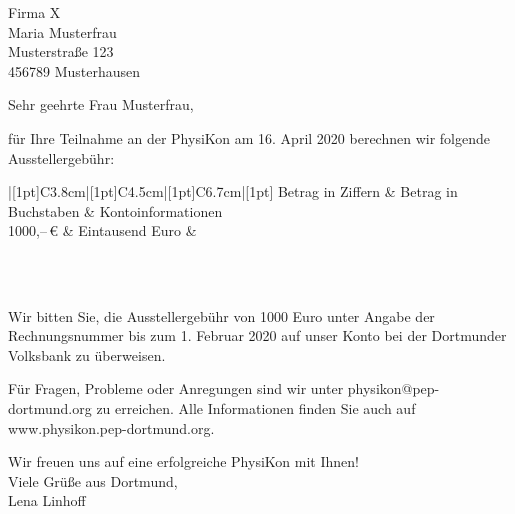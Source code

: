 \documentclass[
  pepbrief,
  fontsize=12pt,
  paper=a4,
  DIV=14,
  parskip=half,
  backaddress=false,
]{scrlttr2}
\author{Lena Linhoff}
\begin{document}
\begin{letter}{%
  Firma X\\
  Maria Musterfrau\\
  Musterstraße 123\\
  456789 Musterhausen
}
\opening{Sehr geehrte Frau Musterfrau,}
für Ihre Teilnahme an der PhysiKon am 16. April 2020 berechnen wir folgende Ausstellergebühr:

\renewcommand{\arraystretch}{1.2}
\begin{center}
  \bfseries\scshape
	\begin{tabu}{|[1pt]C{3.8cm}|[1pt]C{4.5cm}|[1pt]C{6.7cm}|[1pt]}
		\tabucline[1pt]{-}
		 Betrag in Ziffern	&	Betrag in Buchstaben & Kontoinformationen\\
		\tabucline[1pt]{-}
    1000,–\,€ & \normalfont Eintausend Euro & \normalfont \begin{tabular}{@{}c@{}}\end{tabular}\\
		\tabucline[1pt]{-}
	\end{tabu}
\end{center}
Wir bitten Sie, die Ausstellergebühr von 1000 Euro unter Angabe der Rechnungsnummer  bis zum 1. Februar 2020 auf unser Konto bei der Dortmunder Volksbank zu überweisen.

Für Fragen, Probleme oder Anregungen sind wir unter physikon@pep-dortmund.org zu erreichen. Alle Informationen finden Sie auch auf www.physikon.pep-dortmund.org.

Wir freuen uns auf eine erfolgreiche PhysiKon mit Ihnen!\\

Viele Grüße aus Dortmund,\\


Lena Linhoff

\end{letter}
\end{document}
